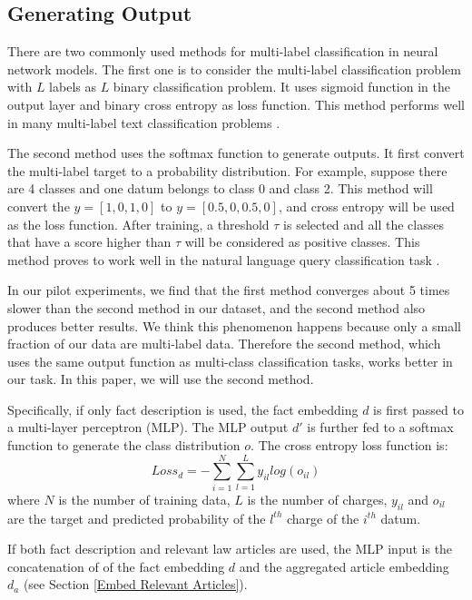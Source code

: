 \subsection{Generating Output}
There are two commonly used methods for multi-label classification in neural network models. The first one is to consider the multi-label classification problem with $L$ labels as $L$ binary classification problem. It uses sigmoid function in the output layer and binary cross entropy as loss function. This method performs well in many multi-label text classification problems \cite{nam2014large}.

The second method uses the softmax function to generate outputs. It first convert the multi-label target to a probability distribution. For example, suppose there are 4 classes and one datum belongs to class 0 and class 2. This method will convert the $y=[1, 0, 1, 0]$ to $y=[0.5, 0, 0.5, 0]$, and cross entropy will be used as the loss function. After training, a threshold $\tau$ is selected and all the classes that have a score higher than $\tau$ will be considered as positive classes. This method proves to work well in the natural language query classification task \cite{kurata2016improved}. 

In our pilot experiments, we find that the first method converges about 5 times slower than the second method in our dataset, and the second method also produces better results. We think this phenomenon happens because only a small fraction of our data are multi-label data. Therefore the second method, which uses the same output function as multi-class classification tasks, works better in our task. In this paper, we will use the second method.

Specifically, if only fact description is used, the fact embedding $d$ is first passed to a multi-layer perceptron (MLP). The MLP output $d'$ is further fed to a softmax function to generate the class distribution $o$. The cross entropy loss function is:
\begin{equation}
\label{original_loss}
Loss_d= -\sum_{i=1}^N\sum_{l=1}^L{y_{il} log(o_{il})}
\end{equation} 
where $N$ is the number of training data, $L$ is the number of charges, $y_{il}$ and $o_{il}$ are the target and predicted probability of the $l^{th}$ charge of the $i^{th}$ datum. 

If both fact description and relevant law articles are used, the MLP input is the concatenation of of the fact embedding $d$ and the aggregated article embedding $d_a$ (see Section \ref{Embed Relevant Articles}).

